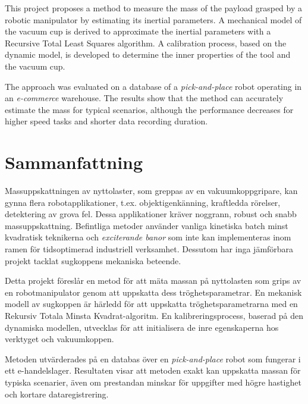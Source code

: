 \documentclass[/home/francois/latex/report/main.tex]{subfiles}
\begin{document}
This project proposes a method to measure the mass of the payload grasped by a robotic manipulator by estimating its inertial parameters. A mechanical model of the vacuum cup is derived to approximate the inertial parameters with a Recursive Total Least Squares algorithm. A calibration process, based on the dynamic model, is developed to determine the inner properties of the tool and the vacuum cup.

The approach was evaluated on a database of a \textit{pick-and-place} robot operating in an \textit{e-commerce} warehouse. The results show that the method can accurately estimate the mass for typical scenarios, although the performance decreases for higher speed tasks and shorter data recording duration.

%

\newpage
\thispagestyle{plain}

\chapter*{Sammanfattning}

Massuppskattningen av nyttolaster, som greppas av en vakuumkoppgripare, kan gynna flera robotapplikationer, t.ex. objektigenkänning, kraftledda rörelser, detektering av grova fel. Dessa applikationer kräver noggrann, robust och snabb massuppskattning. Befintliga metoder använder vanliga kinetiska batch  minst kvadratisk teknikerna och \textit{exciterande banor} som inte kan implementeras inom ramen för tidsoptimerad industriell verksamhet. Dessutom har inga jämförbara projekt tacklat sugkoppens mekaniska beteende.

Detta projekt föreslår en metod för att mäta massan på nyttolasten som grips av en robotmanipulator genom att uppskatta dess tröghetsparametrar. En mekanisk modell av sugkoppen är härledd för att uppskatta tröghetsparametrarna med en Rekursiv Totala Minsta Kvadrat-algoritm. En kalibreringsprocess, baserad på den dynamiska modellen, utvecklas för att initialisera de inre egenskaperna hos verktyget och vakuumkoppen.

Metoden utvärderades på en databas över en \textit{pick-and-place} robot som fungerar i ett e-handelslager. Resultaten visar att metoden exakt kan uppskatta massan för typiska scenarier, även om prestandan minskar för uppgifter med högre hastighet och kortare dataregistrering.
\end{document}
